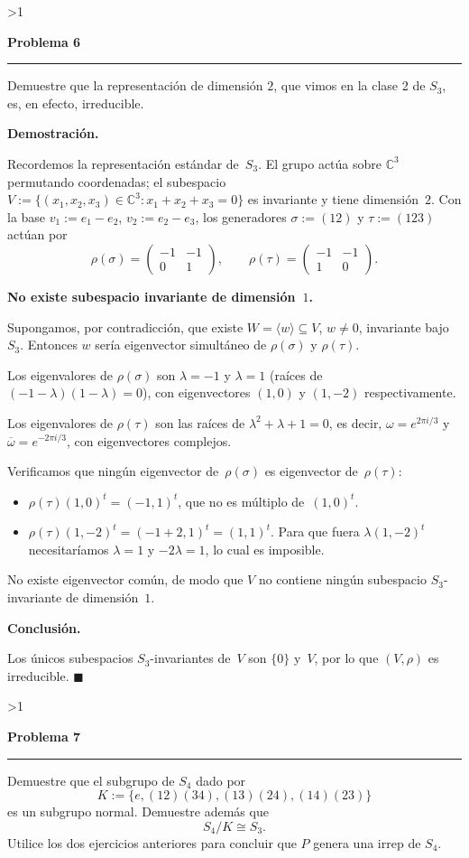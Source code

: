 \documentclass[10pt,a4paper]{article}
\newcommand{\CC}{\mathbb{C}}
\newcommand{\inlinehead}[2][repblue]{%
  \par\smallskip
  {\color{#1}\bfseries #2.}\hspace{0.45em}%
}
\newcounter{probcnt}
\newcommand{\problem}[2]{%
  \stepcounter{probcnt}%
  \ifnum\value{probcnt}>1\newpage\fi
  \par\vspace{0.25em}
  {\large\bfseries\color{repblue} Problema #1}\par
  {\color{repline}\rule{\linewidth}{0.55pt}}\par
  \begin{tcolorbox}[
    breakable,
    colback=white,
    colframe=repline,
    borderline west={1.6pt}{0pt}{repteal},
    left=0.7em,
    right=0.7em,
    top=0.35em,
    bottom=0.3em,
    before skip=0.35em,
    after skip=0.45em
  ]
    #2
  \end{tcolorbox}
}
\begin{document}
\problem{6}{%
Demuestre que la representación de dimensión $2$, que vimos en la clase 2 de
$S_3$, es, en efecto, irreducible.
}

\inlinehead{Demostración}
Recordemos la representación estándar de~$S_3$. El grupo actúa sobre
$\CC^3$ permutando coordenadas; el subespacio
$V:=\{(x_1,x_2,x_3)\in\CC^3 : x_1+x_2+x_3=0\}$ es invariante y tiene
dimensión~$2$. Con la base $v_1:=e_1-e_2$, $v_2:=e_2-e_3$, los
generadores $\sigma:=(12)$ y $\tau:=(123)$ actúan por
\[
  \rho(\sigma)
    = \begin{pmatrix} -1 & -1 \\ 0 & 1 \end{pmatrix},
  \qquad
  \rho(\tau)
    = \begin{pmatrix} -1 & -1 \\ 1 & 0 \end{pmatrix}.
\]

\inlinehead[repteal]{No existe subespacio invariante de dimensión~$1$}
Supongamos, por contradicción, que existe $W=\langle w\rangle\subseteq V$,
$w\neq 0$, invariante bajo~$S_3$. Entonces $w$ sería eigenvector simultáneo
de $\rho(\sigma)$ y $\rho(\tau)$.

Los eigenvalores de $\rho(\sigma)$ son $\lambda=-1$ y $\lambda=1$
(raíces de $(-1-\lambda)(1-\lambda)=0$), con eigenvectores $(1,0)$ y
$(1,-2)$ respectivamente.

Los eigenvalores de $\rho(\tau)$ son las raíces de
$\lambda^2+\lambda+1=0$, es decir, $\omega=e^{2\pi i/3}$ y
$\overline{\omega}=e^{-2\pi i/3}$, con eigenvectores complejos.

Verificamos que ningún eigenvector de~$\rho(\sigma)$ es eigenvector
de~$\rho(\tau)$:
\begin{itemize}
  \item $\rho(\tau)(1,0)^t = (-1,1)^t$, que no es múltiplo de~$(1,0)^t$.
  \item $\rho(\tau)(1,-2)^t = (-1+2,1)^t = (1,1)^t$. Para que fuera
    $\lambda(1,-2)^t$ necesitaríamos $\lambda=1$ y $-2\lambda=1$, lo cual
    es imposible.
\end{itemize}
No existe eigenvector común, de modo que $V$ no contiene ningún subespacio
$S_3$-invariante de dimensión~$1$.

\inlinehead[repteal]{Conclusión}
Los únicos subespacios $S_3$-invariantes de~$V$ son $\{0\}$ y~$V$, por lo
que $(V,\rho)$ es irreducible.
\hfill$\blacksquare$

\problem{7}{%
Demuestre que el subgrupo de $S_4$ dado por
\[
  K := \{e,(12)(34),(13)(24),(14)(23)\}
\]
es un subgrupo normal. Demuestre además que
\[
  S_4/K \cong S_3.
\]
Utilice los dos ejercicios anteriores para concluir que $P$ genera una irrep
de $S_4$.
}
\end{document}
